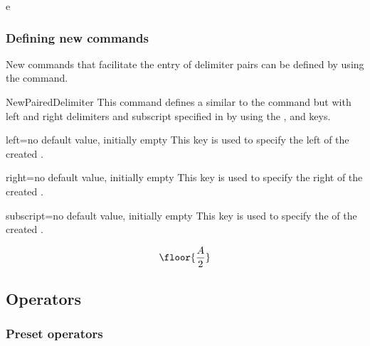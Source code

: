 \documentclass[english,nolocaltoc]{nwejmart}
\newtheorem[style=definition]{fact}
\newtheorem[title=experience]{experience}
\newtheorem[title-plural=rings]{ring}
\newtheorem[title=ideal,title-plural=ideals]{ideal}
\begin{document}
e\subsubsection{Defining new commands}

New commands that facilitate the entry of delimiter pairs can be
defined by using the   command.
%
\begin{docCommand}{NewPairedDelimiter}{}
  This command defines a  similar to the
   command  but with left and right delimiters and
  subscript specified in  by using  the ,
   and  keys.
  \begin{docKey}{left}{=}{no default value, initially empty}
    This key is used to  specify the left  of the created .
  \end{docKey}
  \begin{docKey}{right}{=}{no default value, initially empty}
    This key is used to  specify the right  of the created .
  \end{docKey}
  \begin{docKey}{subscript}{=}{no default value, initially empty}
     This key is used to  specify the  of the
     created .
  \end{docKey}
\end{docCommand}

\begin{preamblecode}[listing options={morekeywords={[2]left,right,subscript}}]
\end{preamblecode}
\begin{bodycode}
\begin{equation}
\floor{\frac{A}{2}}
\end{equation}
\end{bodycode}

\subsection{Operators}

\subsubsection{Preset operators}
\end{document}
